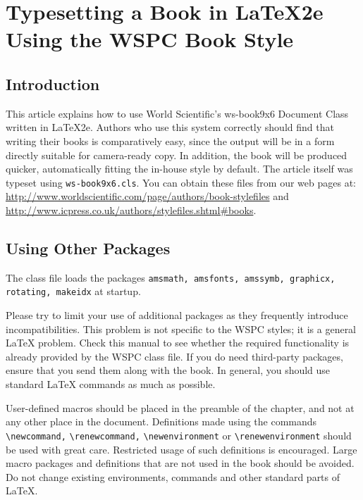 \chapter[Typesetting a Book in \LaTeX2e Using the WSPC Book Style]{Typesetting a Book in \LaTeX2e\\ Using the WSPC Book Style\label{ch1}}

\section{Introduction}\label{sec1.1}
This article explains how to use World Scientific's ws-book9x6
Document Class written in \LaTeX2e. Authors who use this system
correctly should find that writing their books is comparatively
easy, since the output will be in a form directly suitable for
camera-ready copy. In addition, the book will be produced quicker,
automatically fitting the in-house style by default. The article
itself was typeset using \verb|ws-book9x6.cls|.
You can obtain these files from our web pages at:
\url{http://www.worldscientific.com/page/authors/book-stylefiles} and
\url{http://www.icpress.co.uk/authors/stylefiles.shtml#books}.

\section{Using Other Packages}\label{sec1.2}
The class file loads the packages {\tt amsmath, amsfonts, amssymb,
graphicx, rotating, makeidx} at startup.

Please try to limit your use of additional packages
as they frequently introduce incompatibilities. This problem is not
specific to the WSPC styles; it is a general \LaTeX{} problem. Check
this manual to see whether the required functionality is already
provided by the WSPC class file. If you do need third-party
packages, ensure that you send them along with the book. In general,
you should use standard \LaTeX{} commands as much as possible.

User-defined macros should be placed in the preamble of the chapter,
and not at any other place in the document. Definitions made using
the commands \verb|\newcommand,| \verb|\renewcommand,|
\verb|\newenvironment| or \verb|\renewenvironment| should be used
with great care. Restricted usage of such definitions is encouraged.
Large macro packages and definitions that are not used in the book
should be avoided. Do not change existing environments, commands and
other standard parts of \LaTeX.

